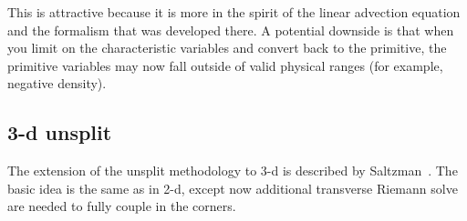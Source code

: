   This is attractive because it is more in the spirit of the linear
  advection equation and the formalism that was developed there.  A
  potential downside is that when you limit on the characteristic
  variables and convert back to the primitive, the primitive variables
  may now fall outside of valid physical ranges (for example, negative
  density).

\subsection{3-d unsplit}

The extension of the unsplit methodology to 3-d is described by
Saltzman~\cite{saltzman:1994}.  The basic idea is the same as in 2-d,
except now additional transverse Riemann solve are needed to fully
couple in the corners.
